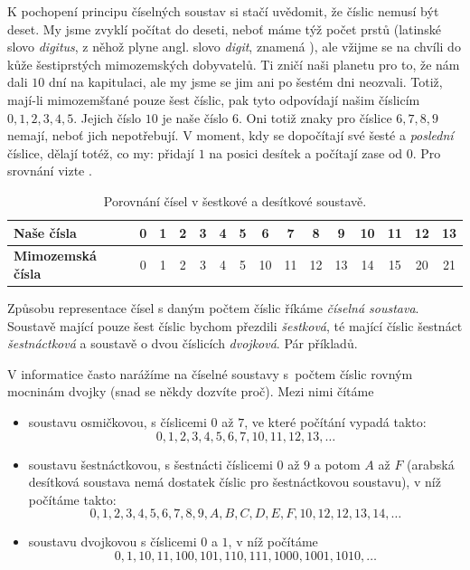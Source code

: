 K pochopení principu číselných soustav si stačí uvědomit, že číslic nemusí být
deset. My jsme zvyklí počítat do deseti, neboť máme týž počet prstů (latinské
  slovo \emph{digitus}, z něhož plyne angl. slovo \emph{digit}, znamená
), ale vžijme se na chvíli do kůže šestiprstých mimozemských
dobyvatelů. Ti zničí naši planetu pro to, že nám dali $10$ dní na kapitulaci,
ale my jsme se jim ani po šestém dni neozvali. Totiž, mají-li mimozemšťané pouze
šest číslic, pak tyto odpovídají našim číslicím $0, 1, 2, 3, 4, 5$. Jejich číslo
$10$ je naše číslo $6$. Oni totiž znaky pro číslice $6, 7, 8, 9$ nemají, neboť
jich nepotřebují. V moment, kdy se dopočítají své šesté a \emph{poslední}
číslice, dělají totéž, co my: přidají $1$ na posici desítek a počítají zase od
$0$. Pro srovnání vizte .

\begin{table}[ht]
  \centering
  \begin{tabular}{l|cccccccccccccc}
    \textbf{Naše čísla} & 0 & 1 & 2 & 3 & 4 & 5 & 6 & 7 & 8 & 9 & 10 & 11 & 12 &
    13\\
    \hline
    \textbf{Mimozemská čísla} & 0 & 1 & 2 & 3 & 4 & 5 & 10 & 11 & 12 & 13 & 14 &
    15 & 20 & 21
  \end{tabular}
  \caption{Porovnání čísel v šestkové a desítkové soustavě.}
  \label{table:sestkova-desitkova}
\end{table}

Způsobu representace čísel s daným počtem číslic říkáme \emph{číselná soustava}.
Soustavě mající pouze šest číslic bychom přezdili \emph{šestková}, té mající
číslic šestnáct \emph{šestnáctková} a soustavě o dvou číslicích \emph{dvojková}.
Pár příkladů.

\begin{example}
  \label{exam:ciselne-soustavy}
  V informatice často narážíme na číselné soustavy s~počtem číslic rovným
  mocninám dvojky (snad se někdy dozvíte proč). Mezi nimi čítáme
  \begin{itemize}
    \item soustavu osmičkovou, s číslicemi $0$ až $7$, ve které počítání vypadá
      takto:
      \[
        0, 1, 2, 3, 4, 5, 6, 7, 10, 11, 12, 13, \ldots
      \]
    \item soustavu šestnáctkovou, s šestnácti číslicemi $0$ až $9$ a potom $A$
      až $F$ (arabská desítková soustava nemá dostatek číslic pro šestnáctkovou
      soustavu), v níž počítáme takto:
      \[
        0, 1, 2, 3, 4, 5, 6, 7, 8, 9, A, B, C, D, E, F, 10, 12, 12,
        13, 14,\ldots
      \]
    \item soustavu dvojkovou s číslicemi $0$ a $1$, v níž počítáme
      \[
        0, 1, 10, 11, 100, 101, 110, 111, 1000, 1001, 1010, \ldots
      \]
  \end{itemize}
\end{example}

